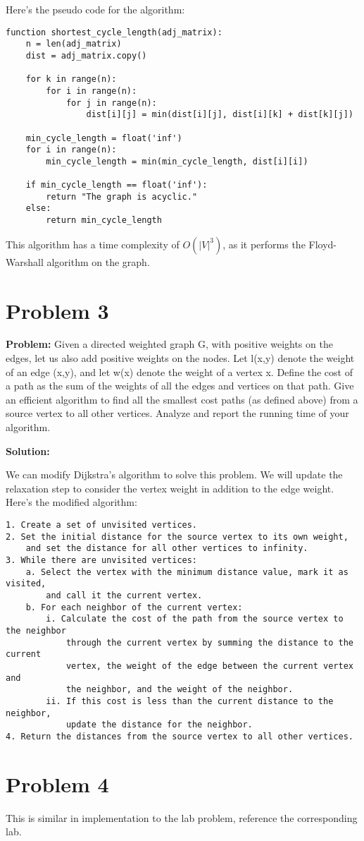 \documentclass[11pt]{article}
\begin{document}
    Here's the pseudo code for the algorithm:

    \begin{verbatim}
function shortest_cycle_length(adj_matrix):
    n = len(adj_matrix)
    dist = adj_matrix.copy()

    for k in range(n):
        for i in range(n):
            for j in range(n):
                dist[i][j] = min(dist[i][j], dist[i][k] + dist[k][j])

    min_cycle_length = float('inf')
    for i in range(n):
        min_cycle_length = min(min_cycle_length, dist[i][i])

    if min_cycle_length == float('inf'):
        return "The graph is acyclic."
    else:
        return min_cycle_length
    \end{verbatim}

    This algorithm has a time complexity of $O(|V|^3)$, as it performs the Floyd-Warshall algorithm on the graph.


    \section{Problem 3}

    \textbf{Problem:} Given a directed weighted graph G, with positive weights on the edges, let us also add positive weights on the nodes. Let l(x,y) denote the weight of an edge (x,y), and let w(x) denote the weight of a vertex x. Define the cost of a path as the sum of the weights of all the edges and vertices on that path. Give an efficient algorithm to find all the smallest cost paths (as defined above) from a source vertex to all other vertices. Analyze and report the running time of your algorithm.

    \textbf{Solution:}

    We can modify Dijkstra's algorithm to solve this problem. We will update the relaxation step to consider the vertex weight in addition to the edge weight. Here's the modified algorithm:

    \begin{verbatim}
1. Create a set of unvisited vertices.
2. Set the initial distance for the source vertex to its own weight,
    and set the distance for all other vertices to infinity.
3. While there are unvisited vertices:
    a. Select the vertex with the minimum distance value, mark it as visited,
        and call it the current vertex.
    b. For each neighbor of the current vertex:
        i. Calculate the cost of the path from the source vertex to the neighbor
            through the current vertex by summing the distance to the current
            vertex, the weight of the edge between the current vertex and
            the neighbor, and the weight of the neighbor.
        ii. If this cost is less than the current distance to the neighbor,
            update the distance for the neighbor.
4. Return the distances from the source vertex to all other vertices.
    \end{verbatim}

    \section{Problem 4}
    This is similar in implementation to the lab problem, reference the corresponding lab.
\end{document}
